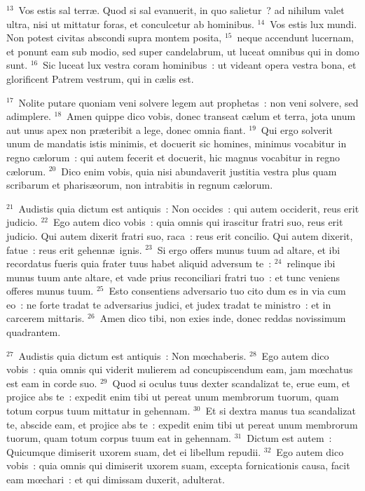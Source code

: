 ${}^{13}$~Vos estis sal terr\ae . Quod si sal evanuerit, in quo salietur~? ad nihilum valet ultra, nisi ut mittatur foras, et conculcetur ab hominibus.
${}^{14}$~Vos estis lux mundi. Non potest civitas abscondi supra montem posita,
${}^{15}$~neque accendunt lucernam, et ponunt eam sub modio, sed super candelabrum, ut luceat omnibus qui in domo sunt.
${}^{16}$~Sic luceat lux vestra coram hominibus~: ut videant opera vestra bona, et glorificent Patrem vestrum, qui in c\ae lis est.


${}^{17}$~Nolite putare quoniam veni solvere legem aut prophetas~: non veni solvere, sed adimplere.
${}^{18}$~Amen quippe dico vobis, donec transeat c\ae lum et terra, jota unum aut unus apex non pr\ae teribit a lege, donec omnia fiant.
${}^{19}$~Qui ergo solverit unum de mandatis istis minimis, et docuerit sic homines, minimus vocabitur in regno c\ae lorum~: qui autem fecerit et docuerit, hic magnus vocabitur in regno c\ae lorum.
${}^{20}$~Dico enim vobis, quia nisi abundaverit justitia vestra plus quam scribarum et pharis\ae orum, non intrabitis in regnum c\ae lorum.


${}^{21}$~Audistis quia dictum est antiquis~: Non occides~: qui autem occiderit, reus erit judicio.
${}^{22}$~Ego autem dico vobis~: quia omnis qui irascitur fratri suo, reus erit judicio. Qui autem dixerit fratri suo, raca~: reus erit concilio. Qui autem dixerit, fatue~: reus erit gehenn\ae\ ignis.
${}^{23}$~Si ergo offers munus tuum ad altare, et ibi recordatus fueris quia frater tuus habet aliquid adversum te~:
${}^{24}$~relinque ibi munus tuum ante altare, et vade prius reconciliari fratri tuo~: et tunc veniens offeres munus tuum.
${}^{25}$~Esto consentiens adversario tuo cito dum es in via cum eo~: ne forte tradat te adversarius judici, et judex tradat te ministro~: et in carcerem mittaris.
${}^{26}$~Amen dico tibi, non exies inde, donec reddas novissimum quadrantem.


${}^{27}$~Audistis quia dictum est antiquis~: Non mœchaberis.
${}^{28}$~Ego autem dico vobis~: quia omnis qui viderit mulierem ad concupiscendum eam, jam mœchatus est eam in corde suo.
${}^{29}$~Quod si oculus tuus dexter scandalizat te, erue eum, et projice abs te~: expedit enim tibi ut pereat unum membrorum tuorum, quam totum corpus tuum mittatur in gehennam.
${}^{30}$~Et si dextra manus tua scandalizat te, abscide eam, et projice abs te~: expedit enim tibi ut pereat unum membrorum tuorum, quam totum corpus tuum eat in gehennam.
${}^{31}$~Dictum est autem~: Quicumque dimiserit uxorem suam, det ei libellum repudii.
${}^{32}$~Ego autem dico vobis~: quia omnis qui dimiserit uxorem suam, excepta fornicationis causa, facit eam mœchari~: et qui dimissam duxerit, adulterat.



